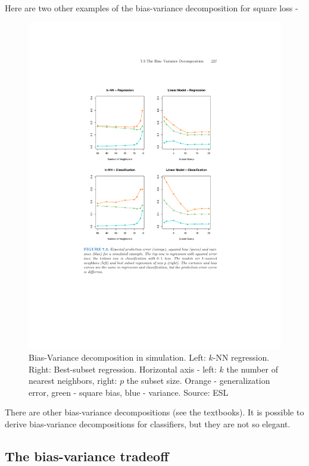 \documentclass[11pt]{article}
\begin{document}
Here are two other examples of the bias-variance decomposition for square loss - 
\begin{figure}[H]
  \centering
  \includegraphics[width=5in]{esl_bias_variance_regression.pdf}
  \caption{Bias-Variance decomposition in simulation. Left: $k$-NN regression. Right:
    Best-subset regression. Horizontal axis - left: $k$ the number of nearest
    neighbors, right: $p$ the subset size. Orange - generalization error, green
    - square bias, blue - variance.
  Source: ESL}
\end{figure}


There are other bias-variance decompositions (see the textbooks). It is possible
to derive bias-variance decompositions for classifiers, but they are not so
elegant. 


\subsection{The bias-variance tradeoff}
\end{document}
